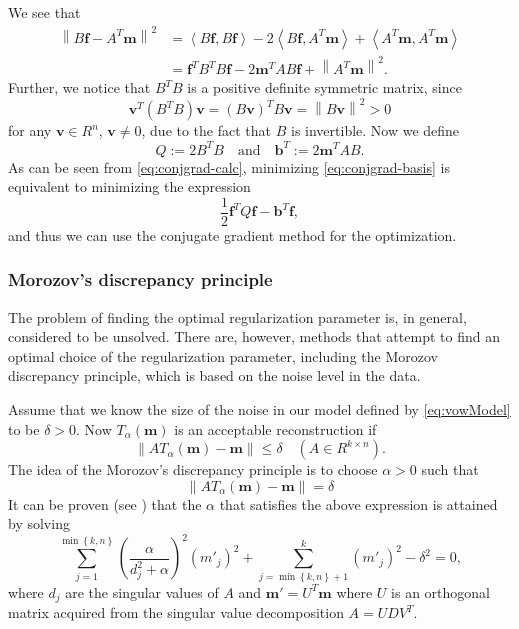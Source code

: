 \documentclass[12pt,a4]{article}
\newcommand{\lnorm}{\left\|}
\newcommand{\rnorm}{\right\|}
\newcommand{\vc}[1]{\ensuremath{\bm{#1}}}
\begin{document}
We see that
\begin{equation}
\label{eq:conjgrad-calc}
\begin{alignedat}{1}
\lnorm B \vc{f} - A^T \vc{m} \rnorm^2
  &= \left< B \vc{f}, B \vc{f} \right> - 2 \left< B \vc{f}, A^T \vc{m} \right> + \left< A^T \vc{m}, A^T \vc{m} \right> \\
  &= \vc{f}^T B^T B \vc{f} - 2 \vc{m}^T A B \vc{f} + \lnorm A^T \vc{m} \rnorm^2 .
\end{alignedat}
\end{equation}
Further, we notice that $B^T B$ is a positive definite symmetric matrix, since
\begin{equation*}
\vc{v}^T (B^T B) \vc{v} = (B \vc{v})^T B \vc{v} = \lnorm B \vc{v} \rnorm^2 > 0
\end{equation*}
for any $\vc{v} \in R^n$, $\vc{v} \neq 0$, due to the fact that $B$ is invertible. Now we define
\begin{equation*}
Q := 2 B^T B \quad \text{and} \quad \vc{b}^T := 2 \vc{m}^T A B .
\end{equation*}
As can be seen from \eqref{eq:conjgrad-calc}, minimizing \eqref{eq:conjgrad-basis} is equivalent to minimizing the expression
\begin{equation}
\frac{1}{2} \vc{f}^T Q \vc{f} - \vc{b}^T \vc{f} ,
\end{equation}
and thus we can use the conjugate gradient method for the optimization.



\subsubsection{Morozov's discrepancy principle}
\label{sec:morozov}
The problem of finding the optimal regularization parameter is, in general, considered to be unsolved. There are, however, methods that attempt to find an optimal choice of the regularization parameter, including the Morozov discrepancy principle, which is based on the noise level in the data.

Assume that we know the size of the noise in our model defined by \eqref{eq:vowModel} to be $\delta > 0$. Now $T_\alpha( \vc{m} )$ is an acceptable reconstruction if 
\begin{equation}
\lnorm AT_\alpha( \vc{m} )- \vc{m} \rnorm \leq \delta \quad \left( A \in R^{k \times n}\right).
\end{equation}
The idea of the Morozov's discrepancy principle is to choose $\alpha > 0$ such that
\begin{equation}
\lnorm AT_\alpha( \vc{m} ) - \vc{m} \rnorm = \delta
\end{equation}
It can be proven (see \cite{samu}) that the $\alpha$ that satisfies the above expression is attained by solving
\begin{equation}\label{eq:morozov_root}
\sum_{j=1}^{\min\left\{ k,n \right\}} \left( \frac{\alpha}{d_j^2 + \alpha} \right)^2 \left( m'_j \right)^2 + \sum_{j = \min\left\{k,n\right\} + 1}^k \left( m'_j \right)^2 - \delta^2 = 0,
\end{equation}
where $d_j$ are the singular values of $A$ and $\vc{m'} = U^T \vc{m}$ where $U$ is an orthogonal matrix acquired from the singular value decomposition $A = U D V^T$.
\end{document}
